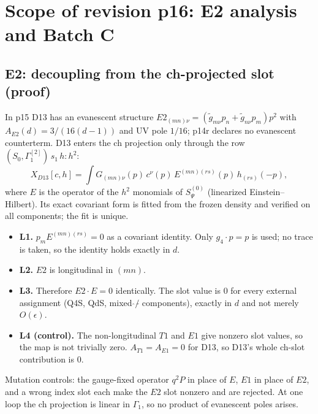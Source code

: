 \section{Scope of revision p16: E2 analysis and Batch C}\label{sec:p16}

\subsection{E2: decoupling from the ch-projected slot (proof)}
In p15 D13 has an evanescent structure $E2_{(mn)\nu}=(\tilde g_{m\nu}p_n+\tilde g_{n\nu}p_m)p^2$ with
$A_{E2}(d)=3/(16(d-1))$ and UV pole $1/16$; p14r declares no evanescent counterterm. D13 enters the ch projection only
through the row $(S_0,\Gamma_1^{[2]})\,s_1\,h{:}h^2$:
\[
X_{D13}[c,h]=\int G_{(mn)\nu}(p)\,c^\nu(p)\,E^{(mn)(rs)}(p)\,h_{(rs)}(-p),
\]
where $E$ is the operator of the $h^2$ monomials of $S_\Psi^{(0)}$ (linearized Einstein--Hilbert). Its exact covariant
form is fitted from the frozen density and verified on all components; the fit is unique.
\begin{itemize}
\item \textbf{L1.} $p_mE^{(mn)(rs)}=0$ as a covariant identity. Only $g_4\cdot p=p$ is used; no trace is taken, so the
identity holds exactly in $d$.
\item \textbf{L2.} $E2$ is longitudinal in $(mn)$.
\item \textbf{L3.} Therefore $E2\cdot E=0$ identically. The slot value is $0$ for every external assignment
(Q4S, QdS, mixed $\hat{}/\tilde{}$ components), exactly in $d$ and not merely $O(\epsilon)$.
\item \textbf{L4 (control).} The non-longitudinal $T1$ and $E1$ give nonzero slot values, so the map is not trivially
zero. $A_{T1}=A_{E1}=0$ for D13, so D13's whole ch-slot contribution is $0$.
\end{itemize}
Mutation controls: the gauge-fixed operator $q^2P$ in place of $E$, $E1$ in place of $E2$, and a wrong index slot
each make the $E2$ slot nonzero and are rejected. At one loop the ch projection is linear in $\Gamma_1$, so no product
of evanescent poles arises.

